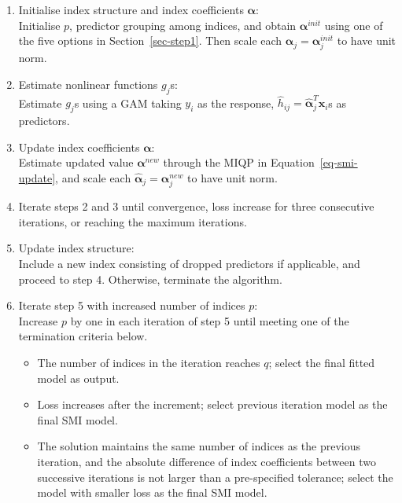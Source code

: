 \documentclass[
  11pt,
  a4paper,
]{article}
\providecommand{\tightlist}{%
  \setlength{\itemsep}{0pt}\setlength{\parskip}{0pt}}\usepackage{longtable,booktabs,array}
\begin{document}
\begin{enumerate}
\def\labelenumi{\arabic{enumi}.}
\tightlist
\item
  Initialise index structure and index coefficients \(\bm{\alpha}\):\\
  Initialise \(p\), predictor grouping among indices, and obtain
  \(\bm{\alpha}^{init}\) using one of the five options in
  Section~\ref{sec-step1}. Then scale each
  \(\hat{\bm{\alpha}}_{j} = \bm{\alpha}_{j}^{init}\) to have unit norm.
\item
  Estimate nonlinear functions \(g_{j}\)s:\\
  Estimate \(g_{j}\)s using a GAM taking \(y_{i}\) as the response,
  \(\hat{h}_{ij} = \hat{\bm{\alpha}}_{j}^{T}\bm{x}_{i}\)s as predictors.
\item
  Update index coefficients \(\bm{\alpha}\):\\
  Estimate updated value \(\bm{\alpha}^{new}\) through the MIQP in
  Equation~\ref{eq-smi-update}, and scale each
  \(\hat{\bm{\alpha}}_{j} = \bm{\alpha}_{j}^{new}\) to have unit norm.
\item
  Iterate steps 2 and 3 until convergence, loss increase for three
  consecutive iterations, or reaching the maximum iterations.
\item
  Update index structure:\\
  Include a new index consisting of dropped predictors if applicable,
  and proceed to step 4. Otherwise, terminate the algorithm.
\item
  Iterate step 5 with increased number of indices \(p\):\\
  Increase \(p\) by one in each iteration of step 5 until meeting one of
  the termination criteria below.

  \begin{itemize}
  \tightlist
  \item
    The number of indices in the iteration reaches \(q\); select the
    final fitted model as output.
  \item
    Loss increases after the increment; select previous iteration model
    as the final SMI model.
  \item
    The solution maintains the same number of indices as the previous
    iteration, and the absolute difference of index coefficients between
    two successive iterations is not larger than a pre-specified
    tolerance; select the model with smaller loss as the final SMI
    model.
  \end{itemize}
\end{enumerate}
\end{document}
